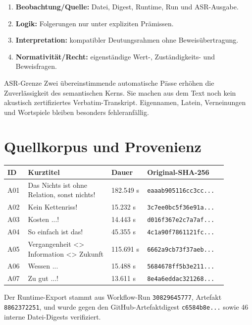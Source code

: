 \documentclass[11pt,a4paper]{article}
\begin{document}
\begin{enumerate}
\item \textbf{Beobachtung/Quelle:} Datei, Digest, Runtime, Run und ASR-Ausgabe.
\item \textbf{Logik:} Folgerungen nur unter expliziten Prämissen.
\item \textbf{Interpretation:} kompatibler Deutungsrahmen ohne Beweisübertragung.
\item \textbf{Normativität/Recht:} eigenständige Wert-, Zuständigkeits- und Beweisfragen.
\end{enumerate}

\begin{boundarybox}{ASR-Grenze}
Zwei übereinstimmende automatische Pässe erhöhen die Zuverlässigkeit des semantischen Kerns. Sie machen aus dem Text noch kein akustisch zertifiziertes Verbatim-Transkript. Eigennamen, Latein, Verneinungen und Wortspiele bleiben besonders fehleranfällig.
\end{boundarybox}

\section{Quellkorpus und Provenienz}
\begin{longtable}{p{0.08\linewidth}p{0.35\linewidth}p{0.15\linewidth}p{0.30\linewidth}}
\toprule
ID & Kurztitel & Dauer & Original-SHA-256 \\
\midrule
\endhead
A01 & Das Nichts ist ohne Relation, sonst nichts! & 182.549 s & \texttt{eaaab905116cc3cc...} \\
A02 & Kein Kettenriss! & 15.232 s & \texttt{3c7ee0bc5f36e91a...} \\
A03 & Kosten ...! & 14.443 s & \texttt{d016f367e2c7a7af...} \\
A04 & So einfach ist das! & 45.355 s & \texttt{4c1a90f7861121fc...} \\
A05 & Vergangenheit \textless{}\textgreater{} Information \textless{}\textgreater{} Zukunft & 115.691 s & \texttt{6662a9cb73f37aeb...} \\
A06 & Wessen ... & 15.488 s & \texttt{5684678ff5b3e211...} \\
A07 & Zu gut ...! & 13.611 s & \texttt{8e4a6eddac321268...} \\
\bottomrule
\end{longtable}

Der Runtime-Export stammt aus Workflow-Run \texttt{30829645777}, Artefakt \texttt{8862372251}, und wurde gegen den GitHub-Artefaktdigest \texttt{c6584b8e...} sowie 46 interne Datei-Digests verifiziert.
\end{document}
